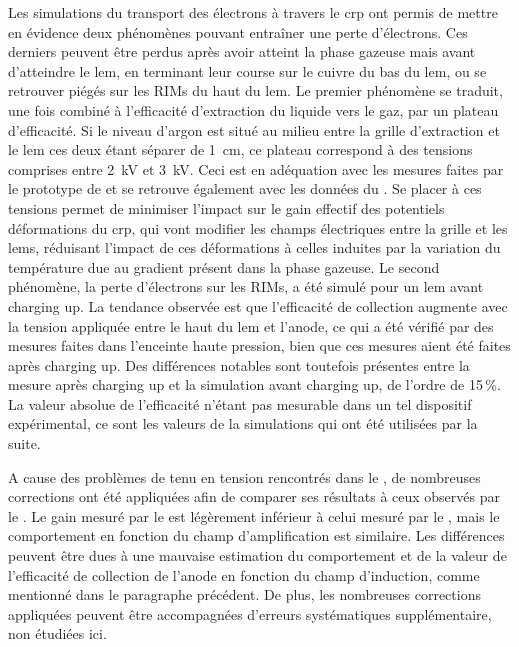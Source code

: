 Les simulations du transport des électrons à travers le \gls{crp} ont permis de mettre en évidence deux phénomènes pouvant entraîner une perte d'électrons. Ces derniers peuvent être perdus après avoir atteint la phase gazeuse mais avant d'atteindre le \gls{lem}, en terminant leur course sur le cuivre du bas du \gls{lem}, ou se retrouver piégés sur les RIMs du haut du \gls{lem}. Le premier phénomène se traduit, une fois combiné à l'efficacité d'extraction du liquide vers le gaz, par un plateau d'efficacité. Si le niveau d'argon est situé au milieu entre la grille d'extraction et le \gls{lem} ces deux étant séparer de \SI{1}{\centi\meter}, ce plateau correspond à des tensions comprises entre \SI{2}{\kilo\volt} et \SI{3}{\kilo\volt}. Ceci est en adéquation avec les mesures faites par le prototype de \threeL{} et se retrouve également avec les données du \TOO{}. Se placer à ces tensions permet de minimiser l'impact sur le gain effectif des potentiels déformations du \gls{crp}, qui vont modifier les champs électriques entre la grille et les \glspl{lem}, réduisant l'impact de ces déformations à celles induites par la variation du température due au gradient présent dans la phase gazeuse. Le second phénomène, la perte d'électrons sur les RIMs, a été simulé pour un \gls{lem} avant charging up. La tendance observée est que l'efficacité de collection augmente avec la tension appliquée entre le haut du \gls{lem} et l'anode, ce qui a été vérifié par des mesures faites dans l'enceinte haute pression, bien que ces mesures aient été faites après charging up. Des différences notables sont toutefois présentes entre la mesure après charging up et la simulation avant charging up, de l'ordre de 15\,\%. La valeur absolue de l'efficacité n'étant pas mesurable dans un tel dispositif expérimental, ce sont les valeurs de la simulations qui ont été utilisées par la suite.

A cause des problèmes de tenu en tension rencontrés dans le \TOO{}, de nombreuses corrections ont été appliquées afin de comparer ses résultats à ceux observés par le \threeL{}. Le gain mesuré par le \TOO{} est légèrement inférieur à celui mesuré par le \threeL{}, mais le comportement en fonction du champ d'amplification est similaire. Les différences peuvent être dues à une mauvaise estimation du comportement et de la valeur de l'efficacité de collection de l'anode en fonction du champ d'induction, comme mentionné dans le paragraphe précédent. De plus, les nombreuses corrections appliquées peuvent être accompagnées d'erreurs systématiques supplémentaire, non étudiées ici.

